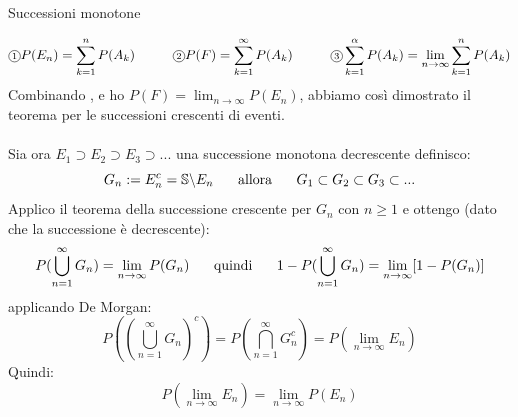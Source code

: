 \begin{Thm}{Successioni monotone}{}
\begin{demonstration}
    \begin{align*}
        \circled{1}P(E_n)=\sum^n_{k=1}P(A_k)\hspace{1cm}\circled{2}P(F)=\sum^\infty_{k=1}P(A_k)\hspace{1cm}\circled{3}\sum^\alpha_{k=1}P(A_k)=\lim_{n\to\infty}\sum^n_{k=1}P(A_k)
    \end{align*}
    Combinando ,  e  ho $P(F)=\lim_{n\to\infty}P(E_n)$, abbiamo così dimostrato il teorema per le successioni crescenti di eventi.\\\\
    Sia ora $E_1\supset E_2\supset E_3\supset ...$ una successione monotona decrescente definisco:
    \begin{equation*}
        G_n:=E_n^c=\mathbb{S}\backslash E_n\hspace{0.5cm}\mbox{ allora }\hspace{0.5cm}G_1\subset G_2\subset G_3\subset...
    \end{equation*}
    Applico il teorema della successione crescente per $G_n$ con $n\geq1$ e ottengo (dato che la successione è decrescente):
    \begin{align*}
        P(\bigcup^\infty_{n=1}G_n)=\lim_{n\to\infty}P(G_n)\hspace{0.5cm}\mbox{ quindi }\hspace{0.5cm}1- P(\bigcup^\infty_{n=1}G_n)=\lim_{n\to\infty}[1-P(G_n)]
    \end{align*}
    applicando De Morgan:
    \begin{equation*}
        P((\bigcup^\infty_{n=1}G_n)^c)=P(\bigcap^\infty_{n=1}G_n^c)=P(\lim_{n\to\infty}E_n)
    \end{equation*}
    Quindi:
    \begin{equation*}
        P(\lim_{n\to\infty}E_n)=\lim_{n\to\infty}P(E_n)
    \end{equation*}
\end{demonstration}
\end{Thm}

